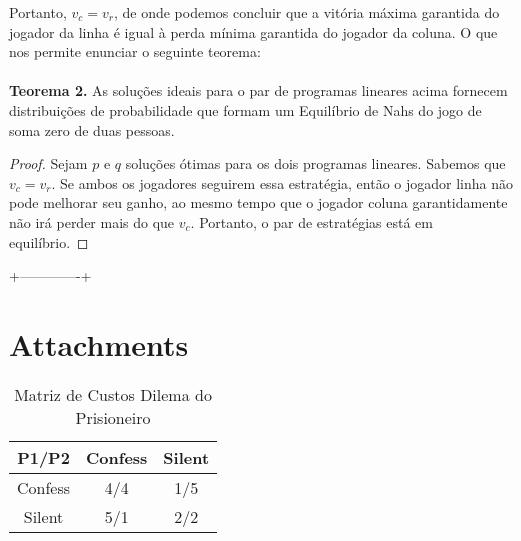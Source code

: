 \documentclass[twoside,conference,a4paper]{IEEEtran}
\begin{document}
            Portanto, $v_c = v_r$, de onde podemos concluir que a vitória máxima garantida do jogador da linha é igual à perda mínima garantida do jogador da coluna. O que nos permite enunciar o seguinte teorema: \\ \\
            \textbf{Teorema 2.} As soluções ideais para o par de programas lineares acima fornecem distribuições de probabilidade que formam um Equilíbrio de Nahs do jogo de soma zero de duas pessoas.\\
            \begin{proof}
                Sejam $p$ e $q$ soluções ótimas para os dois programas lineares. Sabemos que $v_c = v_r$. Se ambos os jogadores seguirem essa estratégia, então o jogador linha não pode melhorar seu ganho, ao mesmo tempo que o jogador coluna garantidamente não irá perder mais do que $v_c$. Portanto, o par de estratégias está em equilíbrio.
            \end{proof}
     +-------------+
    
    
    
    
    \newpage
    \section*{Attachments}
        
        \begin{table}[h!]
            \caption{Matriz de Custos Dilema do Prisioneiro}
            \label{table1: matriz-custo}
            \centering
            \begin{tabular}{|c|c|c|}
                \hline
                \textbf{P1/P2} & Confess & Silent \\ \hline
                Confess        & 4/4     & 1/5    \\ \hline
                Silent         & 5/1     & 2/2    \\ \hline
            \end{tabular}
        \end{table}
        
        
\end{document}
